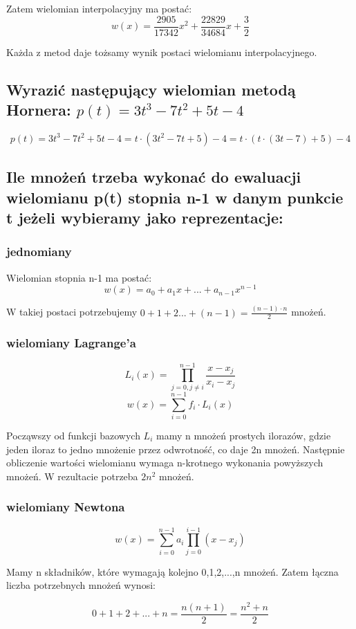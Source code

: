\documentclass[5]{article}
\begin{document}
Zatem wielomian interpolacyjny ma postać:
\[w(x)=\frac{2905}{17342}x^2+\frac{22829}{34684}x+\frac{3}{2}\]

Każda z metod daje tożsamy wynik postaci wielomianu interpolacyjnego.

\subsection{Wyrazić następujący wielomian metodą Hornera: $p(t) = 3t^{3}-7t^{2}+5t-4$}
\[p(t) = 3t^{3}-7t^{2}+5t-4 = t\cdot (3t^{2}-7t+5)-4 = t\cdot(t\cdot (3t-7)+5)-4 \]

\subsection{Ile mnożeń trzeba wykonać do ewaluacji  wielomianu p(t) stopnia n-1 w danym punkcie t jeżeli wybieramy jako reprezentacje:}

\subsubsection{jednomiany}
Wielomian stopnia n-1 ma postać:
\[w(x)=a_{0}+a_{1}x+...+a_{n-1}x^{n-1}\]

W takiej postaci potrzebujemy $0+1+2...+(n-1) = \frac{(n-1)\cdot n}{2}$ mnożeń.

\subsubsection{wielomiany Lagrange'a}
\[L_{i}(x)=\prod_{j=0, j\neq i}^{n-1}\frac{x-x_{j}}{x_{i}-x_{j}}\]
\[w(x)=\sum_{i=0}^{n-1}f_{i}\cdot L_{i}(x)\]

Począwszy od funkcji bazowych $L_{i}$ mamy n mnożeń prostych ilorazów, gdzie jeden iloraz to jedno mnożenie przez odwrotność, co daje 2n mnożeń.
Następnie obliczenie wartości wielomianu wymaga n-krotnego wykonania powyższych mnożeń. W rezultacie potrzeba $2n^2$ mnożeń.



\subsubsection{wielomiany Newtona}
\[w(x)=\sum_{i=0}^{n-1}a_{i}\prod_{j=0}^{i-1}(x-x_{j})\]

Mamy n składników, które wymagają kolejno 0,1,2,...,n mnożeń. Zatem łączna liczba potrzebnych mnożeń wynosi:

\[0+1+2+...+n=\frac{n(n+1)}{2}=\frac{n^2+n}{2}\]
\end{document}
